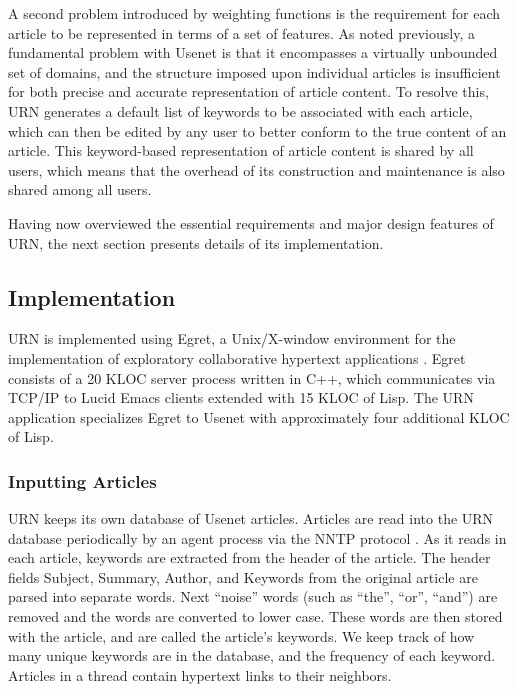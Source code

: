 A second problem introduced by weighting functions is the requirement for
each article to be represented in terms of a set of features.  As noted
previously, a fundamental problem with Usenet is that it encompasses a
virtually unbounded set of domains, and the structure imposed upon
individual articles is insufficient for both precise and accurate
representation of article content.  To resolve this, URN generates a
default list of keywords to be associated with each article, which can then
be edited by any user to better conform to the true content of an article.
This keyword-based representation of article content is shared by all
users, which means that the overhead of its construction and maintenance is
also shared among all users.  

Having now overviewed the essential requirements and major design features
of URN, the next section presents details of its implementation.


\subsection{Implementation}

URN is implemented using Egret, a Unix/X-window environment for the
implementation of exploratory collaborative hypertext applications
\cite{csdl-91-03,csdl-92-01}.  Egret consists of a 20 KLOC server process
written in C++, which communicates via TCP/IP to Lucid Emacs clients
extended with 15 KLOC of Lisp. The URN application specializes Egret to
Usenet with approximately four additional KLOC of Lisp.

\subsubsection{Inputting Articles}

URN keeps its own database of Usenet articles. Articles are read into the
URN database periodically by an agent process via the NNTP protocol
\cite{rfc977}.  As it reads in each article, keywords are extracted from
the header of the article. The header fields Subject, Summary, Author, and
Keywords from the original article are parsed into separate words. Next
``noise'' words (such as ``the'', ``or'', ``and'') are removed and the words
are converted to lower case.  These words are then stored with the article,
and are called the article's keywords. We keep track of how many unique
keywords are in the database, and the frequency of each keyword. Articles
in a thread contain hypertext links to their neighbors.

